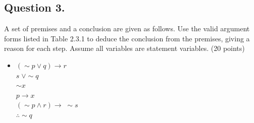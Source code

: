 \documentclass[12pt]{article}
\begin{document}
\subsection*{Question 3.}
A set of premises and a conclusion are given as follows. Use the valid argument forms listed in Table 2.3.1 to deduce the conclusion from the premises, giving a reason for each step. Assume all variables are statement variables. (20 points)
\begin{itemize}
	\item \((\sim p \lor q) \rightarrow r\)\\
	      \(s\; \lor \sim q\)\\
	      \(\sim x\)\\
	      \(p \rightarrow x\)\\
	      \((\sim p \land r) \rightarrow\; \sim s\)\\
	      \(\therefore \sim q\)
\end{itemize}
\end{document}
